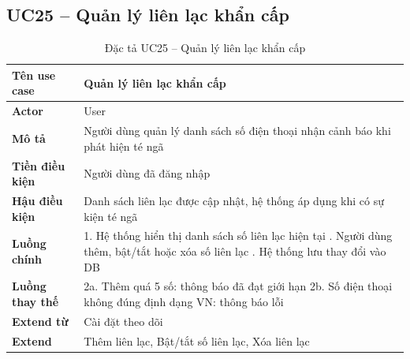 \subsection*{UC25 -- Quản lý liên lạc khẩn cấp}
\begin{table}[H]
    \captionsetup{justification=raggedright, singlelinecheck=false}
    \caption{Đặc tả UC25 -- Quản lý liên lạc khẩn cấp}
\centering
\begin{tabular}{|p{3.5cm}|p{10cm}|}
\hline
\textbf{Tên use case} & Quản lý liên lạc khẩn cấp \\
\hline
\textbf{Actor} & User \\
\hline
\textbf{Mô tả} & Người dùng quản lý danh sách số điện
  thoại nhận cảnh báo khi phát hiện té ngã \\
\hline
\textbf{Tiền điều kiện} & Người dùng đã đăng nhập \\
\hline
\textbf{Hậu điều kiện} & Danh sách liên lạc được cập nhật,
  hệ thống áp dụng khi có sự kiện té ngã \\
\hline
\textbf{Luồng chính} &
  1. Hệ thống hiển thị danh sách số liên lạc hiện tại \newline
  2. Người dùng thêm, bật/tắt hoặc xóa số liên lạc \newline
  3. Hệ thống lưu thay đổi vào DB \\
\hline
\textbf{Luồng thay thế} &
  2a. Thêm quá 5 số: thông báo đã đạt giới hạn \newline
  2b. Số điện thoại không đúng định dạng VN:
  thông báo lỗi \\
\hline
\textbf{Extend từ} & Cài đặt theo dõi \\
\hline
\textbf{Extend} & Thêm liên lạc, Bật/tắt số liên lạc,
  Xóa liên lạc \\
\hline
\end{tabular}

\end{table}

